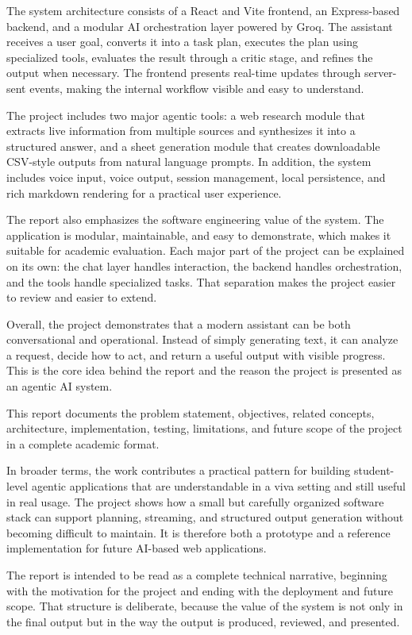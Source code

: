 \documentclass[11pt,oneside]{report}
\begin{document}
The system architecture consists of a React and Vite frontend, an Express-based backend, and a modular AI orchestration layer powered by Groq. The assistant receives a user goal, converts it into a task plan, executes the plan using specialized tools, evaluates the result through a critic stage, and refines the output when necessary. The frontend presents real-time updates through server-sent events, making the internal workflow visible and easy to understand.

The project includes two major agentic tools: a web research module that extracts live information from multiple sources and synthesizes it into a structured answer, and a sheet generation module that creates downloadable CSV-style outputs from natural language prompts. In addition, the system includes voice input, voice output, session management, local persistence, and rich markdown rendering for a practical user experience.

The report also emphasizes the software engineering value of the system. The application is modular, maintainable, and easy to demonstrate, which makes it suitable for academic evaluation. Each major part of the project can be explained on its own: the chat layer handles interaction, the backend handles orchestration, and the tools handle specialized tasks. That separation makes the project easier to review and easier to extend.

Overall, the project demonstrates that a modern assistant can be both conversational and operational. Instead of simply generating text, it can analyze a request, decide how to act, and return a useful output with visible progress. This is the core idea behind the report and the reason the project is presented as an agentic AI system.

This report documents the problem statement, objectives, related concepts, architecture, implementation, testing, limitations, and future scope of the project in a complete academic format.

In broader terms, the work contributes a practical pattern for building student-level agentic applications that are understandable in a viva setting and still useful in real usage. The project shows how a small but carefully organized software stack can support planning, streaming, and structured output generation without becoming difficult to maintain. It is therefore both a prototype and a reference implementation for future AI-based web applications.

The report is intended to be read as a complete technical narrative, beginning with the motivation for the project and ending with the deployment and future scope. That structure is deliberate, because the value of the system is not only in the final output but in the way the output is produced, reviewed, and presented.
\end{document}
